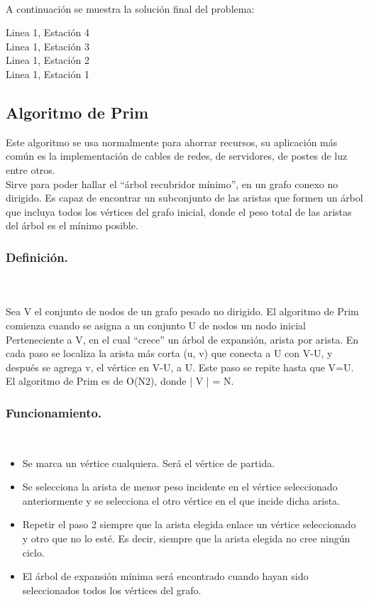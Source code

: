 \documentclass[12pt,twoside]{article}
\begin{document}
\\
A continuación se muestra la solución final del problema:
\begin{center}
    Linea 1, Estación 4\\
    Linea 1, Estación 3\\
    Linea 1, Estación 2\\
    Linea 1, Estación 1\\
\end{center}


\subsection{Algoritmo de Prim}
Este algoritmo se usa normalmente para ahorrar recursos, su aplicación más común es la implementación de cables de redes, de servidores, de postes de luz entre otros.\\

Sirve para poder hallar el “árbol recubridor mínimo”, en un grafo conexo no dirigido. Es capaz de encontrar un subconjunto de las aristas que formen un árbol que incluya todos los vértices del grafo inicial, donde el peso total de las aristas del árbol es el mínimo posible.\newline
\subsubsection{Definición.}\\\\
Sea V el conjunto de nodos de un grafo pesado no dirigido. El algoritmo de Prim comienza cuando se asigna a un conjunto U de nodos un nodo inicial Perteneciente a V, en el cual “crece” un árbol de expansión, arista por arista. En cada paso se localiza la arista más corta (u, v) que conecta a U con V-U, y después se agrega v, el vértice en V-U, a U. Este paso se repite hasta que V=U. El algoritmo de Prim es de O(N2), donde | V | = N.
\newline

\subsubsection{Funcionamiento.}\\
\begin{itemize}
    \item Se marca un vértice cualquiera. Será el vértice de partida.
    \item Se selecciona la arista de menor peso incidente en el vértice seleccionado anteriormente y se selecciona el otro vértice en el que incide dicha arista.
    \item Repetir el paso 2 siempre que la arista elegida enlace un vértice seleccionado y otro que no lo esté. Es decir, siempre que la arista elegida no cree ningún ciclo.
    \item El árbol de expansión mínima será encontrado cuando hayan sido seleccionados todos los vértices del grafo.
\end{itemize}
\end{document}
